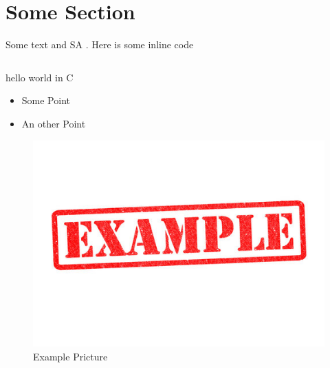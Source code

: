 \section{Some Section}\label{sec:some-sec}
Some text and \ac{SA} \cite{example-source}.
Here is some inline code 

\begin{listing}
  \inputminted{c}{code/code.c}
  \caption{hello world in C}
  \label{lst:hello-world}
\end{listing}

\begin{itemize}
  \item Some Point
  \item An other Point
\end{itemize}

\begin{figure}
  \includegraphics[scale=1]{graphics/example.jpg}
  \centering{}
  \caption{Example Pricture}
  \label{fig:example-fig}
\end{figure}
\restoregeometry{}